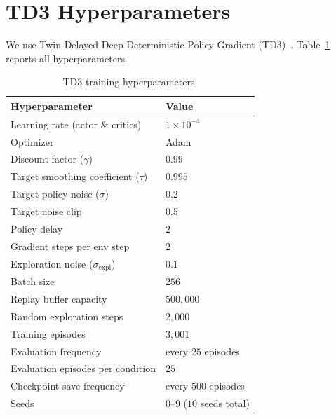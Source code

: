 \section{TD3 Hyperparameters}\label{app:td3}

We use Twin Delayed Deep Deterministic Policy Gradient (TD3)~\cite{fujimoto2018addressing}.
Table~\ref{tab:td3_hyper} reports all hyperparameters.

\begin{table}[h]
\centering
\caption{TD3 training hyperparameters.}
\label{tab:td3_hyper}
\begin{tabular}{ll}
\toprule
\textbf{Hyperparameter}            & \textbf{Value}     \\
\midrule
Learning rate (actor \& critics)   & $1 \times 10^{-4}$ \\
Optimizer                          & Adam               \\
Discount factor ($\gamma$)         & $0.99$             \\
Target smoothing coefficient ($\tau$) & $0.995$         \\
Target policy noise ($\sigma$)     & $0.2$              \\
Target noise clip                  & $0.5$              \\
Policy delay                       & $2$                \\
Gradient steps per env step        & $2$                \\
Exploration noise ($\sigma_{\mathrm{expl}}$) & $0.1$    \\
Batch size                         & $256$              \\
Replay buffer capacity             & $500{,}000$        \\
Random exploration steps           & $2{,}000$          \\
Training episodes                  & $3{,}001$          \\
Evaluation frequency               & every $25$ episodes \\
Evaluation episodes per condition  & $25$               \\
Checkpoint save frequency          & every $500$ episodes \\
Seeds                              & $0$--$9$ ($10$ seeds total) \\
\bottomrule
\end{tabular}
\end{table}


